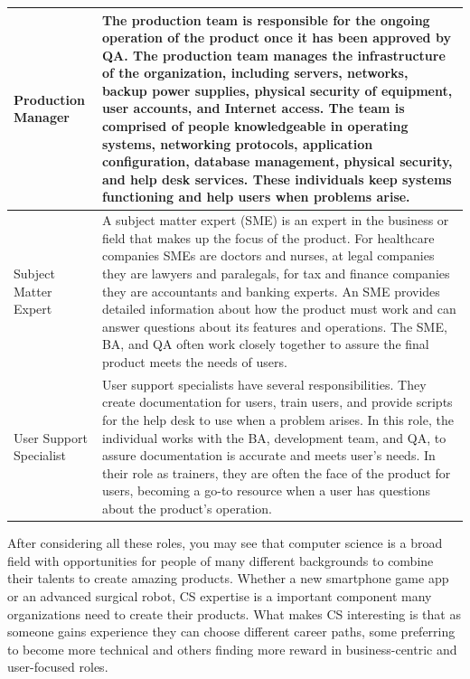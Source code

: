 \begin{longtable}[!htb]{p{.8in}|p{3.6in}}
	\hline
	\Tstrut Production Manager & The production team is responsible for the ongoing operation of the product once it has been approved by QA. The production team manages the infrastructure of the organization, including servers, networks, backup power supplies, physical security of equipment, user accounts, and Internet access. The team is comprised of people knowledgeable in operating systems, networking protocols, application configuration, database management, physical security, and help desk services. These individuals keep systems functioning and help users when problems arise.\\
	\hline
	\Tstrut Subject \linebreak Matter \linebreak Expert & A subject matter expert (SME) is an expert in the business or field that makes up the focus of the product. For healthcare companies SMEs are doctors and nurses, at legal companies they are lawyers and paralegals, for tax and finance companies they are accountants and banking experts. An SME provides detailed information about how the product must work and can answer questions about its features and operations. The SME, BA, and QA often work closely together to assure the final product meets the needs of users.\\
	\hline
	\Tstrut User \linebreak Support \linebreak Specialist & User support specialists have several responsibilities. They create documentation for users, train users, and provide scripts for the help desk to use when a problem arises. In this role, the individual works with the BA, development team, and QA, to assure documentation is accurate and meets user's needs. In their role as trainers, they are often the face of the product for users, becoming a go-to resource when a user has questions about the product's operation.\\ 
	\bottomrule
\end{longtable}


After considering all these roles, you may see that computer science is a broad field with opportunities for people of many different backgrounds to combine their talents to create amazing products. Whether a new smartphone game app or an advanced surgical robot, CS expertise is a important component many organizations need to create their products. What makes CS interesting is that as someone gains experience they can choose different career paths, some preferring to become more technical and others finding more reward in business-centric and user-focused roles.

